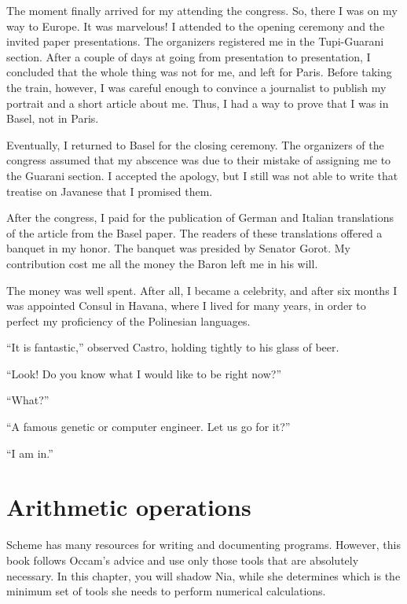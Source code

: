 \documentclass[a4paper,12pt]{book}
\begin{document}
The moment finally arrived for my
attending the congress. So, there
I was on my way to Europe.
It was marvelous! I attended to
the opening ceremony and the invited
paper presentations. The organizers
registered me in the Tupi-Guarani
section. After a couple of days at
going from presentation to presentation,
I concluded that the whole thing was
not for me, and left for Paris.
Before taking the train, however,
I was careful enough to convince a
journalist to publish my portrait
and a short article about me. Thus,
I had a way to prove that I was in
Basel, not in Paris.

Eventually, I returned to Basel for
the closing ceremony. The organizers
of the congress assumed that my
abscence was due to their mistake
of assigning me to the Guarani section.
I accepted the apology, but I still
was not able to write that treatise
on Javanese that I promised them.

After the congress, I paid for the publication
of German and Italian translations of the article
from the Basel paper. The readers of these
translations offered a banquet in my honor.
The banquet was presided by Senator Gorot.
My contribution cost me all the money
the Baron left me in his will.

The money was well spent. After all,
I became a celebrity, and after six
months I was appointed Consul in
Havana, where I lived for many years,
in order to perfect my proficiency
of the Polinesian languages.

``It is fantastic,'' observed Castro, holding
tightly to his glass of beer.

``Look! Do you know what I would like to
be right now?''

``What?''

``A famous genetic or computer engineer. Let us
go for it?''

``I am in.''


\chapter{Arithmetic operations}
Scheme has many resources for writing and documenting programs.
However, this book follows Occam's advice and use only those
tools that are absolutely necessary. In this chapter, you will
shadow Nia, while she determines which is the minimum set of
tools she needs to perform numerical calculations.
\end{document}
